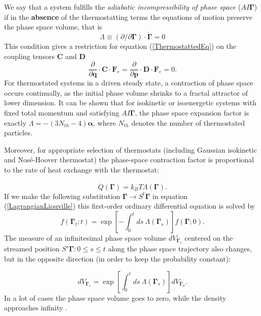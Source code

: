 \documentclass[a4paper,12pt]{article}
\begin{document}
We say that a system fulfills the \textit{adiabatic incompressibility of phase space} ($AI\bm{\Gamma}$) if in the \textbf{absence} of the thermostatting terms the equations of motion preserve the phase space volume, that is
\begin{equation}
  \Lambda \equiv (\partial / \partial\bm{\Gamma}) \cdot \dot{\bm{\Gamma}}=0
\end{equation}
This condition gives a restriction for equation (\ref{ThermostattedEq})
on the coupling tensors $\textbf{C}$ and $\textbf{D}$ 
\begin{equation}
  \frac{\partial}{\partial{\bm{q}}}\cdot\bm{C}\cdot\bm{F}_e=  \frac{\partial}{\partial{\bm{p}}}\cdot\bm{D}\cdot\bm{F}_e =0.
\end{equation}
For thermostated systems in a driven steady state, a contraction of phase space occurs continually, as the initial phase volume shrinks to a fractal attractor of lower dimension.
It can be shown\cite{Evans:2241458} that for isokinetic or isoenergetic systems with fixed total momentum and satisfying $AI\bm{\Gamma}$, the phase space expansion factor is exactly $\Lambda = - (3N_{th} -4) \bm{\alpha} $, where $N_{th}$ denotes the number of thermostated particles.

Moreover, for appropriate selection of thermostats (including Gaussian isokinetic and Nosé-Hoover thermostat) the phase-space contraction factor is proportional to the rate of heat exchange with the thermostat:

\begin{equation}
  \dot{Q}(\bm{\Gamma})=k_B T \Lambda(\bm{\Gamma}).
\end{equation}
If we make the following substitution $\bm{\Gamma} \to S^t\bm{\Gamma}$ in equation (\ref{LagrangianLiouville}) this first-order ordinary differential equation is solved by
\begin{equation}
\label{distributionStreaming}
  f(\bm{\Gamma}_t;t)=\exp[-\int_0^t ds\ \Lambda(\bm{\Gamma}_s)]f(\bm{\Gamma};0).
\end{equation}
The measure of an infinitesimal phase space volume $dV_{\bm{\Gamma}_s}$ centered on the streamed position $S^s\bm{\Gamma} : 0 \leq s \leq t $ along the phase space trajectory also changes, but in the opposite direction (in order to keep the probability constant):

\begin{equation}
\label{PhaseVolumeExpansion}
  dV_{\bm{\Gamma}_s} =\exp[\int_0^t ds\ \Lambda(\bm{\Gamma}_s)]dV_{\bm{\Gamma}_0}.
\end{equation}
In a lot of cases the phase space volume goes to zero, while the density approaches infinity \cite{Evans:2241458}.
\end{document}
